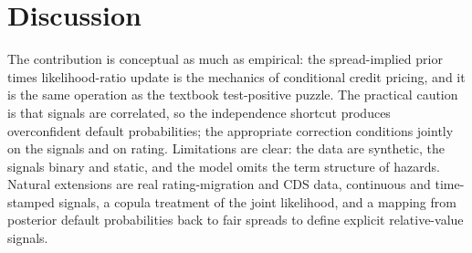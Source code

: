 \documentclass[11pt]{article}
\begin{document}
\section{Discussion}
The contribution is conceptual as much as empirical: the spread-implied prior times
likelihood-ratio update is the mechanics of conditional credit pricing, and it is
the same operation as the textbook test-positive puzzle. The practical caution is
that signals are correlated, so the independence shortcut produces overconfident
default probabilities; the appropriate correction conditions jointly on the signals
and on rating. Limitations are clear: the data are synthetic, the signals binary and
static, and the model omits the term structure of hazards. Natural extensions are
real rating-migration and CDS data, continuous and time-stamped signals, a
copula treatment of the joint likelihood, and a mapping from posterior default
probabilities back to fair spreads to define explicit relative-value signals.



\end{document}
